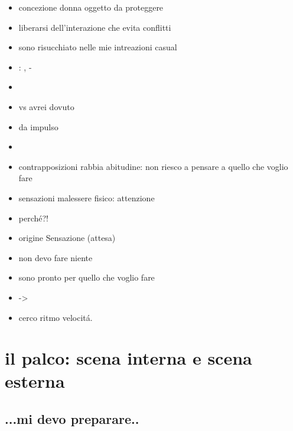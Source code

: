 \begin{itemize}
\item concezione donna oggetto da proteggere

\item liberarsi dell'interazione che evita conflitti

\item sono risucchiato nelle mie intreazioni casual

\item {}: , -

\item {}

\item {} vs  avrei dovuto

\item {} da impulso

\item {}

\item contrapposizioni rabbia abitudine: non riesco a pensare a quello che voglio fare

\item sensazioni malessere fisico: attenzione

\item perch\'e?!

\item origine Sensazione (attesa)

\item non devo fare niente

\item sono pronto per quello che voglio fare

\item {} -> 

\item cerco ritmo velocit\'a. 

\end{itemize}



{\let\clearpage\relax
\chapter{il palco: scena interna e scena esterna}
}
\PartialToc


\section{...mi devo preparare..}


